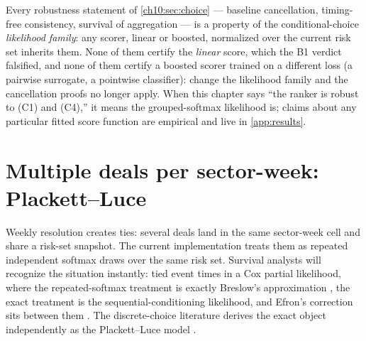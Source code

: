 \begin{warning}\label{warn:ch10:family}
Every robustness statement of \cref{ch10:sec:choice} ---
baseline cancellation, timing-free consistency, survival of aggregation
--- is a property of the conditional-choice \emph{likelihood family}: any
scorer, linear or boosted, normalized over the current risk set inherits
them. None of them certify the \emph{linear} score, which the B1 verdict
falsified, and none of them certify a boosted scorer trained on a
different loss (a pairwise surrogate, a pointwise classifier): change the
likelihood family and the cancellation proofs no longer apply. When this
chapter says ``the ranker is robust to (C1) and (C4),'' it means the
grouped-softmax likelihood is; claims about any particular fitted score
function are empirical and live in \cref{app:results}.
\end{warning}

\section{Multiple deals per sector-week: Plackett--Luce}\label{ch10:sec:ties}

Weekly resolution creates ties: several deals land in the same
sector-week cell and share a risk-set snapshot. The current
implementation treats them as repeated independent softmax draws over the
same risk set. Survival analysts will recognize the situation instantly:
tied event times in a Cox partial likelihood, where the repeated-softmax
treatment is exactly Breslow's approximation \citep{breslow1974}, the
exact treatment is the sequential-conditioning likelihood, and Efron's
correction sits between them \citep{efron1977,therneau2000}. The
discrete-choice literature derives the exact object independently as the
Plackett--Luce model \citep{plackett1975,luce1959}.

